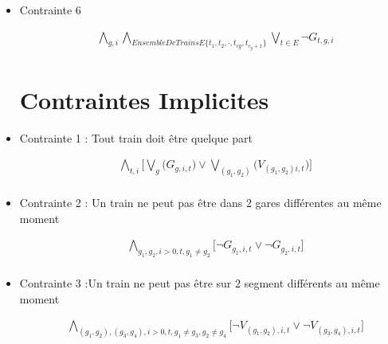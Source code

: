 \documentclass{article}
\begin{document}
\begin{itemize}
\item Contrainte 6

    \begin{equation*}
    \begin{split}
        & \bigwedge_{g, i} \bigwedge_{Ensemble De Trains E \{t_1, t_2, \cdot, t_{cg}, t_{c_g+1}\}} \bigvee_{t \in E} \neg G_{t, g, i}
    \end{split}
    \end{equation*}




\section{Contraintes Implicites}

\item Contrainte 1 : Tout train doit être quelque part

\begin{equation*}
    \begin{split}
      & \bigwedge_{t, i}
      \big[\bigvee_{g} \big(G_{g, i, t} \big) \lor \bigvee_{(g_1, g_2)} \big(V_{(g_1, g_2) i, t} \big) \big] \\
    \end{split}
    \end{equation*}


\item Contrainte 2 : Un train ne peut pas être dans 2 gares différentes au même moment

\begin{equation*}
    \begin{split}
      & \bigwedge_{g_1, g_2, i>0, t, g_1 \neq g_2 }
      \big[\neg G_{g_1, i, t} \lor \neg G_{g_2, i, t} \big] \\
    \end{split}
    \end{equation*}
    
\item Contrainte 3 :Un train ne peut pas être sur 2 segment différents au même moment

\begin{equation*}
    \begin{split}
      & \bigwedge_{(g_1, g_2), (g_3, g_4), i>0, t, g_1 \neq g_3, g_2 \neq g_4 }
      \big[\neg V_{(g_1, g_2), i, t} \lor \neg V_{(g_3, g_4), i, t} \big] \\
    \end{split}
    \end{equation*}


\end{itemize}
\end{document}
